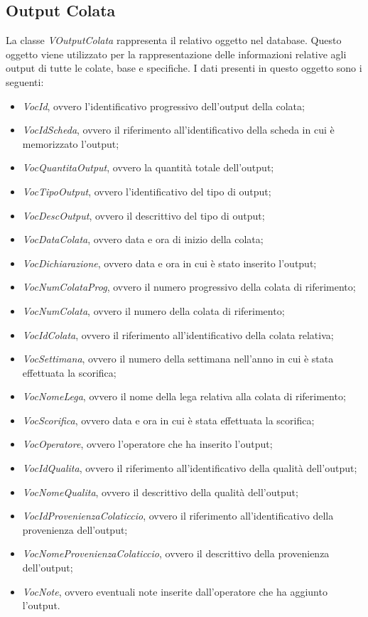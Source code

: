   \subsection{Output Colata}
  La classe \textit{VOutputColata} rappresenta il relativo oggetto nel database. Questo oggetto viene utilizzato per la
  rappresentazione delle informazioni relative agli output di tutte le colate, base e specifiche. I dati presenti in questo
  oggetto sono i seguenti:
  \begin{itemize}
    \item \textit{VocId}, ovvero l'identificativo progressivo dell'output della colata;
    \item \textit{VocIdScheda}, ovvero il riferimento all'identificativo della scheda in cui è memorizzato l'output;
    \item \textit{VocQuantitaOutput}, ovvero la quantità totale dell'output;
    \item \textit{VocTipoOutput}, ovvero l'identificativo del tipo di output;
    \item \textit{VocDescOutput}, ovvero il descrittivo del tipo di output;
    \item \textit{VocDataColata}, ovvero data e ora di inizio della colata;
    \item \textit{VocDichiarazione}, ovvero data e ora in cui è stato inserito l'output;
    \item \textit{VocNumColataProg}, ovvero il numero progressivo della colata di riferimento;
    \item \textit{VocNumColata}, ovvero il numero della colata di riferimento;
    \item \textit{VocIdColata}, ovvero il riferimento all'identificativo della colata relativa;
    \item \textit{VocSettimana}, ovvero il numero della settimana nell'anno in cui è stata effettuata la scorifica;
    \item \textit{VocNomeLega}, ovvero il nome della lega relativa alla colata di riferimento;
    \item \textit{VocScorifica}, ovvero data e ora in cui è stata effettuata la scorifica;
    \item \textit{VocOperatore}, ovvero l'operatore che ha inserito l'output;
    \item \textit{VocIdQualita}, ovvero il riferimento all'identificativo della qualità dell'output;
    \item \textit{VocNomeQualita}, ovvero il descrittivo della qualità dell'output;
    \item \textit{VocIdProvenienzaColaticcio}, ovvero il riferimento all'identificativo della provenienza dell'output;
    \item \textit{VocNomeProvenienzaColaticcio}, ovvero il descrittivo della provenienza dell'output;
    \item \textit{VocNote}, ovvero eventuali note inserite dall'operatore che ha aggiunto l'output.
  \end{itemize}
  

